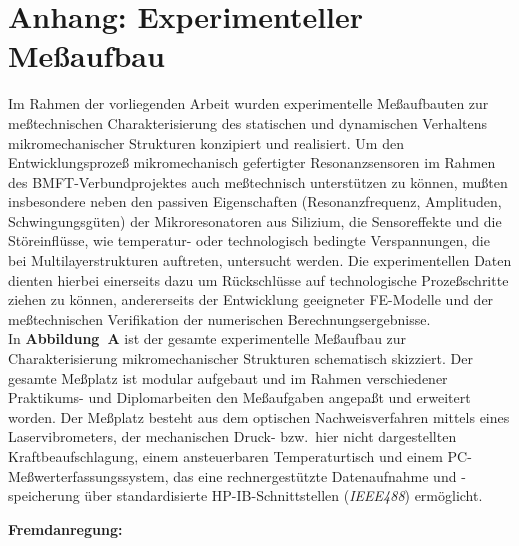 
\chapter*{Anhang: Experimenteller Meßaufbau}
\label{anhang}

Im Rahmen der vorliegenden Arbeit wurden experimentelle Meßaufbauten zur
meßtechnischen Charakterisierung des statischen und dynamischen Verhaltens
mikromechanischer Strukturen konzipiert und realisiert. Um den
Entwicklungsprozeß mikromechanisch gefertigter Resonanzsensoren im Rahmen
des BMFT-Verbundprojektes auch meßtechnisch unterstützen zu können, mußten
insbesondere neben den passiven Eigenschaften (Resonanzfrequenz, Amplituden,
Schwingungsgüten) der Mikroresonatoren aus Silizium, die Sensoreffekte
und die Störeinflüsse, wie temperatur- oder technologisch bedingte
Verspannungen, die bei Multilayerstrukturen auftreten, untersucht werden.
Die experimentellen Daten dienten hierbei einerseits dazu um Rückschlüsse auf
technologische Prozeßschritte ziehen zu können, andererseits der
Entwicklung geeigneter FE-Modelle und der meßtechnischen Verifikation der
numerischen Berechnungsergebnisse.\\
In {\bf Abbildung~A} ist der gesamte experimentelle Meßaufbau zur
Charakterisierung mikromechanischer Strukturen schematisch skizziert.
Der gesamte Meßplatz ist modular aufgebaut und im Rahmen verschiedener
Praktikums- und Diplomarbeiten den Meßaufgaben angepaßt und erweitert
worden. Der Meßplatz besteht aus dem optischen Nachweisverfahren mittels
eines Laservibrometers, der mechanischen Druck- bzw.\ hier nicht
dargestellten Kraftbeaufschlagung, einem ansteuerbaren
Temperaturtisch und einem PC-Meßwerterfassungssystem, das eine
rechnergestützte Datenaufnahme und -speicherung über standardisierte
{\sf HP-IB}-Schnittstellen ({\em IEEE488}) ermöglicht.


{\bf Fremdanregung:}

